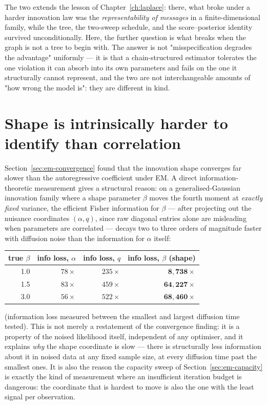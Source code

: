 \begin{remark}
The two extends the lesson of Chapter~\ref{ch:laplace}: there, what broke
under a harder innovation law was the \emph{representability of messages} in
a finite-dimensional family, while the tree, the two-sweep schedule, and the
score--posterior identity survived unconditionally. Here, the further
question is what breaks when the graph is not a tree to begin with. The
answer is not "misspecification degrades the advantage" uniformly --- it is
that a chain-structured estimator tolerates the one violation it can
absorb into its own parameters and fails on the one it structurally cannot
represent, and the two are not interchangeable amounts of "how wrong the
model is": they are different in kind.
\end{remark}

\section{Shape is intrinsically harder to identify than correlation}
\label{sec:em-information}

Section~\ref{sec:em-convergence} found that the innovation shape converges
far slower than the autoregressive coefficient under EM. A direct
information-theoretic measurement gives a structural reason: on a
generalised-Gaussian innovation family where a shape parameter $\beta$
moves the fourth moment at \emph{exactly fixed} variance, the efficient
Fisher information for $\beta$ --- after projecting out the nuisance
coordinates $(\alpha, q)$, since raw diagonal entries alone are misleading
when parameters are correlated --- decays two to three orders of magnitude
faster with diffusion noise than the information for $\alpha$ itself:

\begin{center}
\begin{tabular}{@{}rrrr@{}}
\toprule
true $\beta$ & info loss, $\alpha$ & info loss, $q$ & info loss, $\beta$ (shape) \\
\midrule
1.0 & $78\times$ & $235\times$ & $\mathbf{8{,}738\times}$ \\
1.5 & $83\times$ & $459\times$ & $\mathbf{64{,}227\times}$ \\
3.0 & $56\times$ & $522\times$ & $\mathbf{68{,}460\times}$ \\
\bottomrule
\end{tabular}
\end{center}
\noindent (information loss measured between the smallest and largest
diffusion time tested). This is not merely a restatement of the convergence
finding: it is a property of the noised likelihood itself, independent of
any optimiser, and it explains \emph{why} the shape coordinate is slow ---
there is structurally less information about it in noised data at any fixed
sample size, at every diffusion time past the smallest ones. It is also the
reason the capacity sweep of Section~\ref{sec:em-capacity} is exactly the
kind of measurement where an insufficient iteration budget is dangerous: the
coordinate that is hardest to move is also the one with the least signal per
observation.

